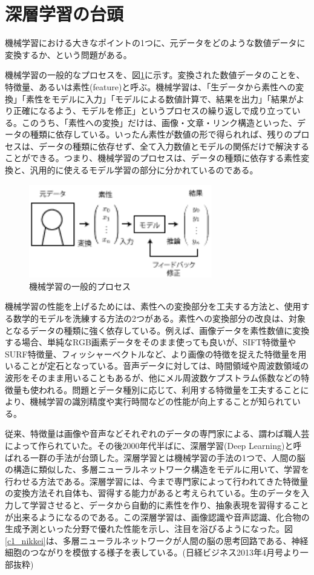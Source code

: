 \section{深層学習の台頭}
機械学習における大きなポイントの1つに、元データをどのような数値データに変換するか、という問題がある。\par
機械学習の一般的なプロセスを、図\ref{c1_ml}に示す。変換された数値データのことを、 特徴量、あるいは素性(feature)と呼ぶ。機械学習は、「生データから素性への変換」「素性をモデルに入力」「モデルによる数値計算で、結果を出力」「結果がより正確になるよう、モデルを修正」というプロセスの繰り返しで成り立っている。このうち、「素性への変換」だけは、画像・文章・リンク構造といった、データの種類に依存している。いったん素性が数値の形で得られれば、残りのプロセスは、データの種類に依存せず、全て入力数値とモデルの関係だけで解決することができる。つまり、機械学習のプロセスは、データの種類に依存する素性変換と、汎用的に使えるモデル学習の部分に分かれているのである。
\begin{figure}[tbp]
 \centering
  \includegraphics[width=80mm]{img/c1/ml}
 \caption{機械学習の一般的プロセス}
 \label{c1_ml}
\end{figure}
\par
機械学習の性能を上げるためには、素性への変換部分を工夫する方法と、使用する数学的モデルを洗練する方法の2つがある。素性への変換部分の改良は、対象となるデータの種類に強く依存している。例えば、画像データを素性数値に変換する場合、単純なRGB画素データをそのまま使っても良いが、SIFT特徴量\cite{lowe1999object}やSURF特徴量\cite{bay2008speeded-up}、フィッシャーベクトル\cite{perronnin2007fisher}など、より画像の特徴を捉えた特徴量を用いることが定石となっている。音声データに対しては、時間領域や周波数領域の波形をそのまま用いることもあるが、他にメル周波数ケプストラム係数などの特徴量も使われる\cite{logan2000mel-frequency}。問題とデータ種別に応じて、利用する特徴量を工夫することにより、機械学習の識別精度や実行時間などの性能が向上することが知られている。\par
従来、特徴量は画像や音声などそれぞれのデータの専門家による、謂わば職人芸によって作られていた。その後2000年代半ばに、深層学習(Deep Learning)と呼ばれる一群の手法が台頭した。深層学習とは機械学習の手法の1つで、人間の脳の構造に類似した、多層ニューラルネットワーク構造をモデルに用いて、学習を行わせる方法である。深層学習には、今まで専門家によって行われてきた特徴量の変換方法それ自体も、習得する能力があると考えられている。生のデータを入力して学習させると、データから自動的に素性を作り、抽象表現を習得することが出来るようになるのである。この深層学習は、画像認識や音声認識、化合物の生成予測といった分野で優れた性能を示し、注目を浴びるようになった。図\ref{c1_nikkei}は、多層ニューラルネットワークが人間の脳の思考回路である、神経細胞のつながりを模倣する様子を表している。(日経ビジネス2013年4月号より一部抜粋)\\
